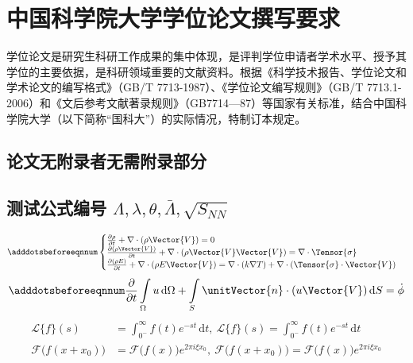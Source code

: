 \chapter{中国科学院大学学位论文撰写要求}

学位论文是研究生科研工作成果的集中体现，是评判学位申请者学术水平、授予其学位的主要依据，是科研领域重要的文献资料。根据《科学技术报告、学位论文和学术论文的编写格式》（GB/T 7713-1987）、《学位论文编写规则》（GB/T 7713.1-2006）和《文后参考文献著录规则》（GB7714—87）等国家有关标准，结合中国科学院大学（以下简称“国科大”）的实际情况，特制订本规定。

\section{论文无附录者无需附录部分}

\section{测试公式编号 \texorpdfstring{$\Lambda,\lambda,\theta,\bar{\Lambda},\sqrt{S_{NN}}$}{$\textLambda,\textlambda,\texttheta,\bar{\textLambda},\sqrt{S_{NN}}$}} \label{sec:testmath}

\begin{equation} \label{eq:appedns}
    \adddotsbeforeeqnnum%
    \begin{cases}
        \frac{\partial \rho}{\partial t} + \nabla\cdot(\rho\Vector{V}) = 0\\
        \frac{\partial (\rho\Vector{V})}{\partial t} + \nabla\cdot(\rho\Vector{V}\Vector{V}) = \nabla\cdot\Tensor{\sigma}\\
        \frac{\partial (\rho E)}{\partial t} + \nabla\cdot(\rho E\Vector{V}) = \nabla\cdot(k\nabla T) + \nabla\cdot(\Tensor{\sigma}\cdot\Vector{V})
    \end{cases}
\end{equation}
\begin{equation}
    \adddotsbeforeeqnnum%
    \frac{\partial }{\partial t}\int\limits_{\Omega} u \, \mathrm{d}\Omega + \int\limits_{S} \unitVector{n}\cdot(u\Vector{V}) \, \mathrm{d}S = \dot{\phi}
\end{equation}
\[
    \begin{split}
        \mathcal{L} \{f\}(s) &= \int _{0^{-}}^{\infty} f(t) e^{-st} \, \mathrm{d}t, \ 
        \mathscr{L} \{f\}(s) = \int _{0^{-}}^{\infty} f(t) e^{-st} \, \mathrm{d}t\\
        \mathcal{F} {\bigl (} f(x+x_{0}) {\bigr )} &= \mathcal{F} {\bigl (} f(x) {\bigr )} e^{2\pi i\xi x_{0}}, \ 
        \mathscr{F} {\bigl (} f(x+x_{0}) {\bigr )} = \mathscr{F} {\bigl (} f(x) {\bigr )} e^{2\pi i\xi x_{0}}
    \end{split}
\]


